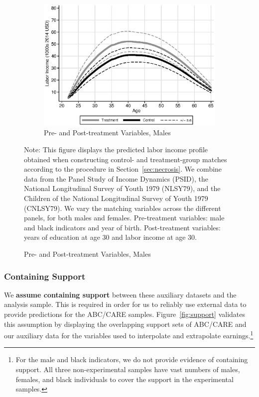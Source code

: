 \begin{figure}
\begin{subfigure}[h]{0.3\textwidth}
\end{subfigure}%
\begin{subfigure}[h]{0.3\textwidth}
	\centering
	\caption{Pre- and Post-treatment Variables, Males}
		\includegraphics[width=\textwidth]{output/labor_25-65_pset1_mset3_male_sensitivity.eps}
\end{subfigure}
\footnotesize \justify
Note: This figure displays the predicted labor income profile obtained when constructing control- and treatment-group matches according to the procedure in Section~\ref{sec:necrosis}. We combine data from the Panel Study of Income Dynamics (PSID), the National Longitudinal Survey of Youth 1979 (NLSY79), and the Children of the National Longitudinal Survey of Youth 1979 (CNLSY79). We vary the matching variables across the different panels, for both males and females. Pre-treatment variables: male and black indicators and year of birth. Post-treatment variables: years of education at age 30 and labor income at age 30.
\end{figure}

\subsubsection{Containing Support}\label{app:containsupport}

\noindent We \textbf{assume containing support} between these auxiliary datasets and the analysis sample. This is required in order for us to reliably use external data to provide predictions for the ABC/CARE samples. Figure~\ref{fig:support} validates this assumption by displaying the overlapping support sets of ABC/CARE and our auxiliary data for the variables used to interpolate and extrapolate earnings.\footnote{For the male and black indicators, we do not provide evidence of containing support. All three non-experimental samples have vast numbers of males, females, and black individuals to cover the support in the experimental samples.}\\

